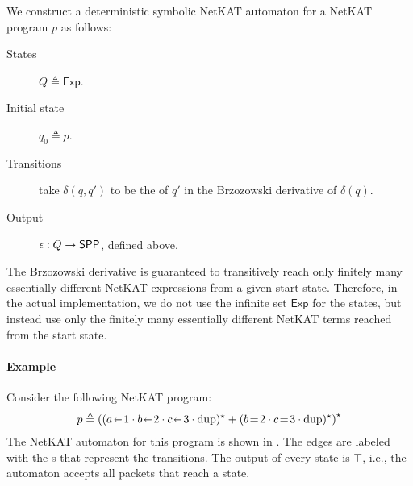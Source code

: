 \documentclass[acmsmall,dvipsnames,nonacm]{acmart}
\begin{document}
We construct a deterministic symbolic NetKAT automaton for a NetKAT program $p$ as follows:
\begin{description}
    \item[States] $Q \triangleq \mathsf{Exp}$.
    \item[Initial state] $q_0 \triangleq p$.
    \item[Transitions] take $\delta(q,q')$ to be the \SPPn{} of $q'$ in the Brzozowski derivative of $\delta(q)$.
    \item[Output] $\epsilon : Q \to \mathsf{SPP}$, defined above.
\end{description}
The Brzozowski derivative is guaranteed to transitively reach only finitely many essentially different NetKAT expressions from a given start state.
Therefore, in the actual implementation, we do not use the infinite set $\mathsf{Exp}$ for the states, but instead use only the finitely many essentially different NetKAT terms reached from the start state.

\paragraph{Example}
Consider the following NetKAT program:
\begin{align*}
    p \triangleq \left((a \mut 1 \cdot b \mut 2 \cdot c \mut 3 \cdot \text{dup})^\star + (b \test 2 \cdot c \test 3 \cdot \text{dup})^\star\right)^\star
\end{align*}
The NetKAT automaton for this program is shown in .
The edges are labeled with the \SPPn{}s that represent the transitions.
The output \SPPn{} of every state is $\top$, i.e., the automaton accepts all packets that reach a state.
\end{document}
